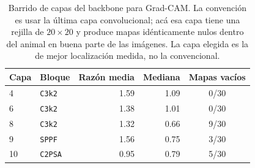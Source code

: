 \begin{table}[t]
  \centering
  \small
  \begin{tabular}{llrrc}
    \toprule
    Capa & Bloque & Razón media & Mediana & Mapas vacíos \\
    \midrule
    4 & \texttt{C3k2} & 1.59 & 1.09 & 0/30 \\
    6 & \texttt{C3k2} & 1.38 & 1.01 & 0/30 \\
    8 & \texttt{C3k2} & 1.32 & 0.66 & 9/30 \\
    9 & \texttt{SPPF} & 1.56 & 0.75 & 3/30 \\
    10 & \texttt{C2PSA} & 0.95 & 0.79 & 5/30 \\
    \bottomrule
  \end{tabular}
  \caption{Barrido de capas del backbone para Grad-CAM. La convención es usar la última capa convolucional; acá esa capa tiene una rejilla de $20\times20$ y produce mapas idénticamente nulos dentro del animal en buena parte de las imágenes. La capa elegida es la de mejor localización medida, no la convencional.}
  \label{tab:capas}
\end{table}
